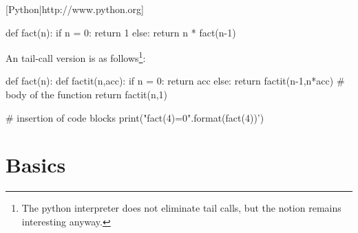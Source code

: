  [Python|http://www.python.org]


\begin{code}[language=python] %
def fact(n):
  if n = 0:
    return 1
  else:
    return n * fact(n-1)
\end{code}


\set[defaultcodelanguage=python]



An tail-call version is as follows\footnote{The python interpreter does not eliminate tail calls, but the notion remains interesting anyway.}:


\begin{code}[coderef=factit]  
def fact(n):
  def factit(n,acc):
    if n = 0:
      return acc
   else:
      return factit(n-1,n*acc)
  # body of the function
  return factit(n,1)
\end{code}

\begin{evalcode} %
# insertion of code blocks
\coderef[factit]
print("fact(4)={0}".format(fact(4))')
\end{evalcode} %

\section{Basics}
